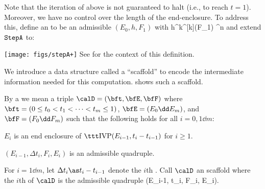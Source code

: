 	Note that the iteration of 
	above is not guaranteed to halt (i.e.,
	to reach $t=1$).  Moreover, we have no control over the length of
	the end-enclosure.
	To address this, define an 
	to be an admissible $(E_0,h,F_1)$ with 	
	h^k\bff^{[k]}(F_1) \ib[-\veps,\veps]^n
	\eeql
	and extend ${\mbox{\tt StepA}}$ to:

		\texttt{[image: figs/stepA+]}
	\eeql
	See  for the context of this definition.

	We introduce a data structure called a ``scaffold'' to encode the
	intermediate information needed for this computation.
	 shows such a scaffold.


	By a  we mean a triple
		$\calD =(\bft,\bfE,\bfF)$
	where
		$\bft= (0\le t_0 < t_1 < \cdots < t_m\le 1)$,
		$\bfE = (E_0 \dd E_m)$,
		and $\bfF = (F_0 \dd F_m)$ such that
		the following holds for all $i=0,1\dd m$:
	\benum
	\item $E_i$ is an end enclosure of
		$\ivp(E_{i-1},t_i-t_{i-1})$  for $i\ge 1$.
	\item $(E_{i-1}, \Delta t_i, F_i,E_i)$ is an admissible quadruple.
	\eenum
	
	For $i=1\dd m$, let
			$\Delta t_i\as  t_i-t_{i-1}$
	denote the $i$th .  Call $\calD$
	an  scaffold where the $i$th 
	of $\calD$ is the admissible quadruple
				(E_{i-1}, \Delta t_i, F_i, E_i).\eeql


